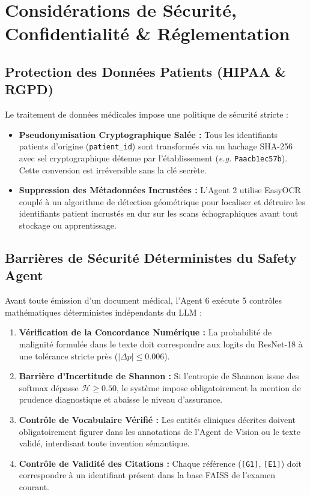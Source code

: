 \documentclass[11pt,a4paper]{article}
\begin{document}
\section{Considérations de Sécurité, Confidentialité \& Réglementation}
\label{sec:security_considerations}

\subsection{Protection des Données Patients (HIPAA \& RGPD)}
Le traitement de donn\'ees m\'edicales impose une politique de s\'ecurit\'e stricte :
\begin{itemize}
    \item \textbf{Pseudonymisation Cryptographique Salée :} Tous les identifiants patients d'origine (\texttt{patient\_id}) sont transform\'es via un hachage SHA-256 avec sel cryptographique d\'etenue par l'\'etablissement (\textit{e.g.} \texttt{Paacb1ec57b}). Cette conversion est irr\'eversible sans la cl\'e secr\`ete.
    \item \textbf{Suppression des Métadonnées Incrustées :} L'Agent 2 utilise EasyOCR coupl\'e \`a un algorithme de d\'etection g\'eom\'etrique pour localiser et d\'etruire les identifiants patient incrust\'es en dur sur les scans \'echographiques avant tout stockage ou apprentissage.
\end{itemize}

\subsection{Barrières de Sécurité Déterministes du Safety Agent}
Avant toute \'emission d'un document m\'edical, l'Agent 6 ex\'ecute 5 contr\^oles math\'ematiques d\'eterministes ind\'ependants du LLM :
\begin{enumerate}
    \item \textbf{Vérification de la Concordance Numérique :} La probabilit\'e de malignit\'e formul\'ee dans le texte doit correspondre aux logits du ResNet-18 \`a une tol\'erance stricte pr\`es ($|\Delta p| \le 0.006$).
    \item \textbf{Barrière d'Incertitude de Shannon :} Si l'entropie de Shannon issue des softmax d\'epasse $\mathcal{H} \ge 0.50$, le syst\`eme impose obligatoirement la mention de prudence diagnostique et abaisse le niveau d'assurance.
    \item \textbf{Contrôle de Vocabulaire Vérifié :} Les entit\'es cliniques d\'ecrites doivent obligatoirement figurer dans les annotations de l'Agent de Vision ou le texte valid\'e, interdisant toute invention s\'emantique.
    \item \textbf{Contrôle de Validité des Citations :} Chaque r\'ef\'erence (\texttt{[G1]}, \texttt{[E1]}) doit correspondre \`a un identifiant pr\'esent dans la base FAISS de l'examen courant.
\end{enumerate}
\end{document}
